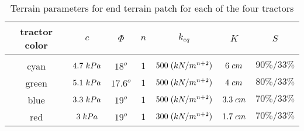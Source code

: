 \begin{table}[htbp]
\caption{Terrain parameters for end terrain patch for each of the four tractors}
\label{table:end_terrain_4tractors_WC}
\begin{center}
\vspace{-5mm}
\begin{tabular}{ |c|c|c|c|c|c|c| } 
 \hline
 tractor color & $c$ & $\Phi$ & $n$ & $k_{eq}$ & $K$ & $S$ \\ 
 \hline
  \vspace{-0.6mm} & \vspace{-0.6mm} & \vspace{-0.6mm} & \vspace{-0.6mm} & \vspace{-0.6mm} & \vspace{-0.6mm} & \vspace{-0.6mm}  \\ 
 \hline
 cyan & $4.7\hspace{1mm}kPa$ & $18^o$ & $1$ & $500\hspace{1mm}(kN/m^{n+2})$ & $6\hspace{1mm}cm$ & $ 90\%/33\%$ \\ 
 \hline
 green & $5.1\hspace{1mm}kPa$ & $17.6^o$ & $1$ & $500\hspace{1mm}(kN/m^{n+2})$ & $4\hspace{1mm}cm$ & $80\%/33\%$ \\ 
 \hline
 blue & $3.3\hspace{1mm}kPa$ & $19^o$ & $1$ & $500\hspace{1mm}(kN/m^{n+2})$ & $3.3\hspace{1mm}cm$ & $70\%/33\%$ \\ 
 \hline
 red & $3\hspace{1mm}kPa$ & $19^o$ & $1$ & $300\hspace{1mm}(kN/m^{n+2})$ & $1.7\hspace{1mm}cm$ & $70\%/33\%$ \\ 
 \hline
\end{tabular}
\end{center}
\end{table}
